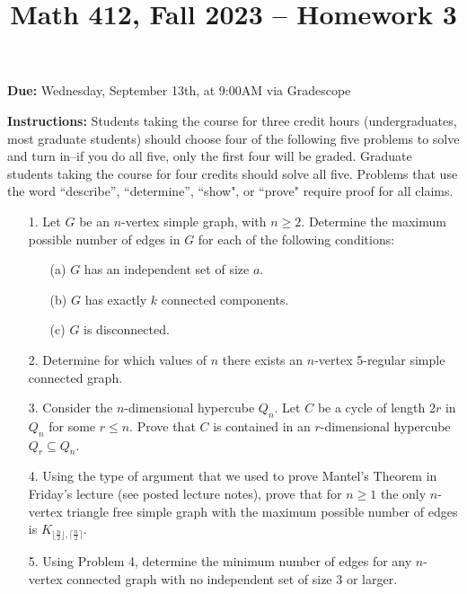 \documentclass[12pt]{article}
\title{Math 412, Fall 2023 -- Homework 3}
\date{}
\begin{document}
 \maketitle
\vspace{-80pt}

\textbf{Due:} Wednesday, September 13th, at 9:00AM via Gradescope

\textbf{Instructions:} Students taking the course for three credit hours (undergraduates, most graduate
students) should choose four of the following five problems to solve and turn in--if you do all five, only the first four will be graded. Graduate students
taking the course for four credits should solve all five. Problems that use the word ``describe”,
``determine”, ``show", or ``prove" require proof for all claims.

\begin{enumerate}

\item[1.] Let $G$ be an $n$-vertex simple graph, with $n \ge 2$. Determine the maximum possible number of
edges in $G$ for each of the following conditions:

\begin{enumerate}
\item[(a)] $G$ has an independent set of size $a$.
\item[(b)] $G$ has exactly $k$ connected components.
\item[(c)] $G$ is disconnected.
\end{enumerate}

\item[2.] Determine for which values of $n$ there exists an $n$-vertex 5-regular simple connected graph.

\item[3.] Consider the $n$-dimensional hypercube $Q_n$. Let $C$ be a cycle of length $2r$ in $Q_n$ for some $r\le n$. Prove that $C$ is contained in an $r$-dimensional hypercube $Q_r\subseteq Q_n$.

\item[4.] Using the type of argument that we used to prove Mantel’s Theorem in Friday's lecture (see posted
lecture notes), prove that for $n\ge 1$ the only $n$-vertex triangle free simple graph with the
maximum possible number of edges is $K_{\lfloor \frac{n}{2}\rfloor,\lceil \frac{n}{2}\rceil}$.

\item[5.] Using Problem 4, determine the minimum number of edges for any $n$-vertex connected graph with no independent set of size 3 or larger.


\end{enumerate}
\end{document}
